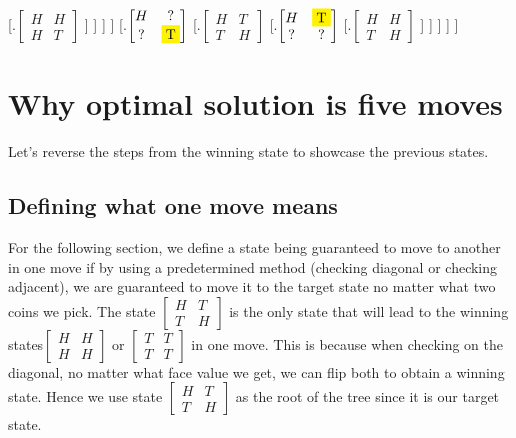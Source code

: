 \documentclass{article}
\begin{document}
                 [.{$\begin{bmatrix}H & H \\ H & T \end{bmatrix}$}
                 ]
            ] 
        ]
    ]  
    [.{$\begin{bmatrix}H & ? \\ ? & \colorbox{yellow}{T} \end{bmatrix}$} 
        [.{$\begin{bmatrix}H & T \\ T & H \end{bmatrix}$} 
            [.{$\begin{bmatrix}H & \colorbox{yellow}{T} \\ ? & ? \end{bmatrix}$}
                [.{$\begin{bmatrix}H & H \\ T & H \end{bmatrix}$}
                ]
            ]
        ]
    ] 
]
    
    
    




\section{Why optimal solution is five moves}


Let's reverse the steps from the winning state to showcase the previous states. 

\subsection{Defining what one move means}
For the following section, we define a state being guaranteed to move to another in one move if by using a predetermined method (checking diagonal or checking adjacent), we are guaranteed to move it to the target state no matter what two coins we pick. The state  $\begin{bmatrix}
H & T \\
T & H
\end{bmatrix}$ is the only state that will lead to the winning states$\begin{bmatrix}
H & H \\
H & H
\end{bmatrix}$ or $\begin{bmatrix}
T & T \\
T & T
\end{bmatrix}$ in one move. This is because when checking on the diagonal, no matter what face value we get, we can flip both to obtain a winning state. Hence we use state $\begin{bmatrix}
H & T \\
T & H
\end{bmatrix}$ as the root of the tree since it is our target state. 
\end{document}
